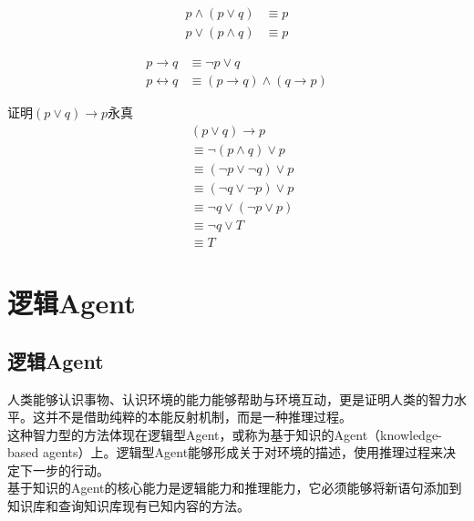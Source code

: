 \begin{tcolorbox}
    \begin{align}
        p \wedge (p \vee q) & \equiv p \\
        p \vee (p \wedge q) & \equiv p
    \end{align}
\end{tcolorbox}

\begin{tcolorbox}
    \begin{align}
        p \rightarrow q     & \equiv \neg p \vee q                              \\
        p \leftrightarrow q & \equiv (p \rightarrow q) \wedge (q \rightarrow p)
    \end{align}
\end{tcolorbox}

\begin{tcolorbox}
    证明$ (p \vee q) \rightarrow p $永真
    \begin{align*}
         & (p \vee q) \rightarrow p           \\
         & \equiv \neg (p \wedge q) \vee p    \\
         & \equiv (\neg p \vee \neg q) \vee p \\
         & \equiv (\neg q \vee \neg p) \vee p \\
         & \equiv \neg q \vee (\neg p \vee p) \\
         & \equiv \neg q \vee T               \\
         & \equiv T
    \end{align*}
\end{tcolorbox}

\newpage

\section{逻辑Agent}

\subsection{逻辑Agent}

人类能够认识事物、认识环境的能力能够帮助与环境互动，更是证明人类的智力水平。这并不是借助纯粹的本能反射机制，而是一种推理过程。\\

这种智力型的方法体现在逻辑型Agent，或称为基于知识的Agent（knowledge-based agents）上。逻辑型Agent能够形成关于对环境的描述，使用推理过程来决定下一步的行动。\\

基于知识的Agent的核心能力是逻辑能力和推理能力，它必须能够将新语句添加到知识库和查询知识库现有已知内容的方法。\\

